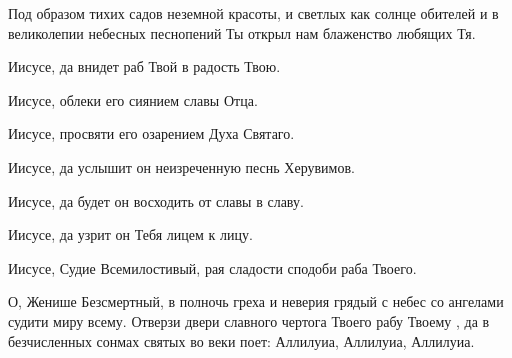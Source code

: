 \begin{mymulticols}

Под образом тихих садов неземной красоты, и светлых как солнце обителей и в великолепии небесных песнопений Ты открыл нам блаженство любящих Тя. 

Иисусе, да внидет раб Твой в радость Твою. 

Иисусе, облеки его сиянием славы Отца. 

Иисусе, просвяти его озарением Духа Святаго. 

Иисусе, да услышит он неизреченную песнь Херувимов. 

Иисусе, да будет он восходить от славы в славу. 

Иисусе, да узрит он Тебя лицем к лицу. 

Иисусе, Судие Всемилостивый, рая сладости сподоби раба Твоего.


О, Женише Безсмертный, в полночь греха и неверия грядый с небес со ангелами судити миру всему. Отверзи двери славного чертога Твоего рабу Твоему , да в безчисленных сонмах святых во веки поет: Аллилуиа, Аллилуиа, Аллилуиа. 


\akafistZaEdinIkosOne

\akafistZaEdinKondakOne

\end{mymulticols}

\mychapterending


